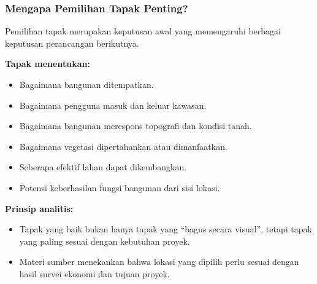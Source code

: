 \documentclass[../main.tex]{subfiles}
\begin{document}
\begin{frame}[mytitle=standard, t, mycolor=digiPH_gray, light]
	\frametitle{Mengapa Pemilihan Tapak Penting?}

	Pemilihan tapak merupakan keputusan awal yang memengaruhi berbagai keputusan perancangan berikutnya.

	\vspace{0.3cm}
	\textbf{Tapak menentukan:}
	\begin{itemize}
		\item Bagaimana bangunan ditempatkan.
		\item Bagaimana pengguna masuk dan keluar kawasan.
		\item Bagaimana bangunan merespons topografi dan kondisi tanah.
		\item Bagaimana vegetasi dipertahankan atau dimanfaatkan.
		\item Seberapa efektif lahan dapat dikembangkan.
		\item Potensi keberhasilan fungsi bangunan dari sisi lokasi.
	\end{itemize}

	\vspace{0.3cm}
	\textbf{Prinsip analitis:}
	\begin{itemize}
		\item Tapak yang baik bukan hanya tapak yang ``bagus secara visual'', tetapi tapak yang paling sesuai dengan kebutuhan proyek.
		\item Materi sumber menekankan bahwa lokasi yang dipilih perlu sesuai dengan hasil survei ekonomi dan tujuan proyek.
	\end{itemize}
\end{frame}
\end{document}
